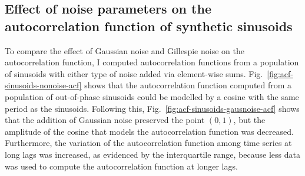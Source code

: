 \subsection{Effect of noise parameters on the autocorrelation function of synthetic sinusoids}
\label{subsec:analysis-characterisation-acf-sinusoid}

To compare the effect of Gaussian noise and Gillespie noise on the autocorrelation function, I computed autocorrelation functions from a population of sinusoids with either type of noise added via element-wise sums.
Fig.\ \ref{fig:acf-sinusoids-nonoise-acf} shows that the autocorrelation function computed from a population of out-of-phase sinusoids could be modelled by a cosine with the same period as the sinusoids.
Following this, Fig.\ \ref{fig:acf-sinusoids-gausnoise-acf} shows that the addition of Gaussian noise preserved the point $(0,1)$, but the amplitude of the cosine that models the autocorrelation function was decreased.
Furthermore, the variation of the autocorrelation function among time series at long lags was increased, as evidenced by the interquartile range, because less data was used to compute the autocorrelation function at longer lags.%


